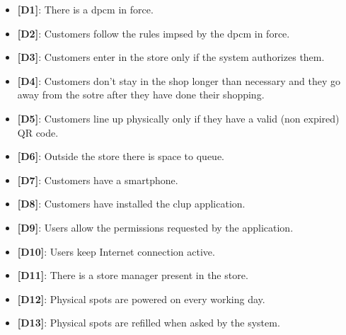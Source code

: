 \begin{itemize}

	\item \textbf{{[D1]}}: There is a \gls{dpcm} in force.
	\item \textbf{{[D2]}}: Customers follow the rules impsed by the \gls{dpcm} in force.
	\item \textbf{{[D3]}}: Customers enter in the store only if the system authorizes them.
	\item \textbf{{[D4]}}: Customers don't stay in the shop longer than necessary and they go away from the sotre after they have done their shopping.
	\item \textbf{{[D5]}}: Customers line up physically only if they have a valid (non expired) QR code.
	\item \textbf{{[D6]}}: Outside the store there is space to queue.
	\item \textbf{{[D7]}}: Customers have a smartphone.
	\item \textbf{{[D8]}}: Customers have installed the \gls{clup} application.
	\item \textbf{{[D9]}}: Users allow the permissions requested by the application.
	\item \textbf{{[D10]}}: Users keep Internet connection active.
	\item \textbf{{[D11]}}: There is a store manager present in the store.
	\item \textbf{{[D12]}}: Physical spots are powered on every working day.
	\item \textbf{{[D13]}}: Physical spots are refilled when asked by the system.

\end{itemize}